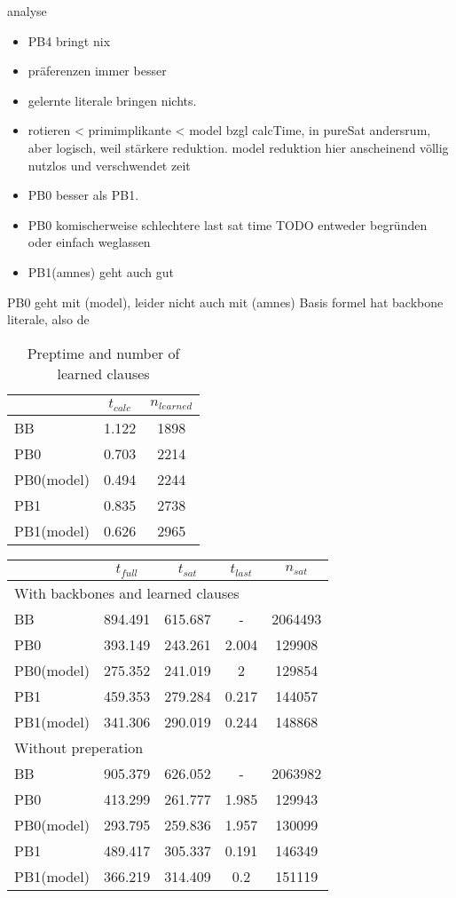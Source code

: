 analyse
\begin{itemize}
\item PB4 bringt nix
\item präferenzen immer besser
\item gelernte literale bringen nichts.
\item rotieren < primimplikante < model bzgl calcTime, in pureSat andersrum, aber logisch, weil stärkere reduktion. model reduktion hier anscheinend völlig nutzlos und verschwendet zeit
\item PB0 besser als PB1. 
\item PB0 komischerweise schlechtere last sat time TODO entweder begründen oder einfach weglassen
\item PB1(amnes) geht auch gut
\end{itemize}
PB0 geht mit (model), leider nicht auch mit (amnes)
Basis formel hat backbone literale, also de


\begin{wraptable}{R}{6cm}
\begin{tabular}{l| c c}
& $t_{calc}$& $n_{learned}$\\
\hline
BB & 1.122 & 1898 \\
PB0 & 0.703 & 2214 \\
PB0(model) & 0.494 & 2244 \\
PB1 & 0.835 & 2738 \\
PB1(model) & 0.626 & 2965 \\
\end{tabular}
\caption{Preptime and number of learned clauses}
\end{wraptable}



\begin{wraptable}{r}{8cm}
\begin{tabular}{l | c c c c}
 & $t_{full}$ & $t_{sat}$ & $t_{last}$& $n_{sat}$\\
\hline
\multicolumn{5}{l}{With backbones and learned clauses}\\
BB & 894.491 & 615.687 & - & 2064493\\
PB0 & 393.149 & 243.261 & 2.004 & 129908\\
PB0(model) & 275.352 & 241.019 & 2 & 129854\\
PB1 & 459.353 & 279.284 & 0.217 & 144057\\
PB1(model) & 341.306 & 290.019 & 0.244 & 148868\\
\hline 
\multicolumn{3}{l}{Without preperation}\\
BB & 905.379 & 626.052 & - & 2063982\\
PB0 & 413.299 & 261.777 & 1.985 & 129943\\
PB0(model) & 293.795 & 259.836 & 1.957 & 130099\\
PB1 & 489.417 & 305.337 & 0.191 & 146349\\
PB1(model) & 366.219 & 314.409 & 0.2 & 151119\\
\hline
\end{tabular}
\end{wraptable}

